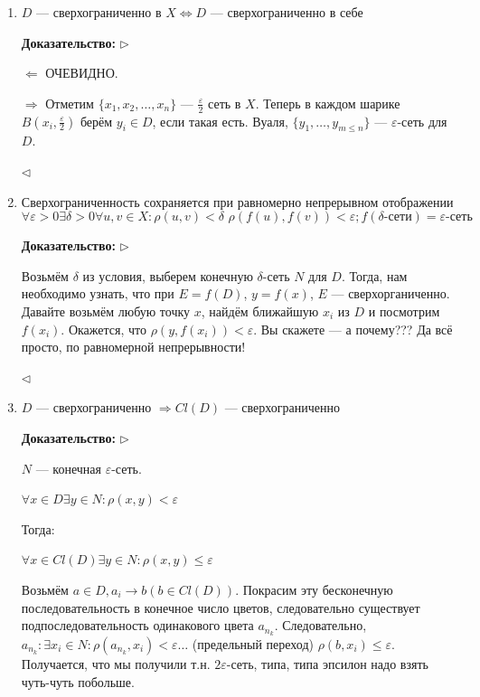 \documentclass{article}
\def\dbl{\,\,}
\begin{document}
\begin{enumerate}
    \item $D\text{ --- сверхограниченно в }X \Leftrightarrow D\text{ --- сверхограниченно в себе}$
    
    \textbf{Доказательство:}
    $\rhd$
    
    $\Leftarrow$ ОЧЕВИДНО.
    
    $\Rightarrow$ Отметим $\{x_1, x_2, \ldots, x_n\} $ --- $ \frac{\varepsilon}{2}$ сеть в $X$. Теперь в каждом шарике $B(x_i, \frac{\varepsilon}{2})$ берём $y_i \in D$, если такая есть. Вуаля, $\{y_1, \ldots, y_{m \le n}\}$ --- $\varepsilon$-сеть для $D$.
    
    $\lhd$

    \item $\text{Сверхограниченность сохраняется при равномерно непрерывном отображении}$ \[\forall \varepsilon > 0 \exists \delta > 0 \forall u, v \in X: \rho(u, v) < \delta \dbl \rho(f(u), f(v)) < \varepsilon; f(\delta\text{-сети}) = \varepsilon\textit{-сеть}\]
    
    \textbf{Доказательство:}
    $\rhd$
    
    Возьмём $\delta$ из условия, выберем конечную $\delta$-сеть $N$ для $D$. Тогда, нам необходимо узнать, что при $E = f(D)$, $y = f(x)$, $E$ --- сверхорганиченно. Давайте возьмём любую точку $x$, найдём ближайшую $x_i$ из $D$ и посмотрим $f(x_i)$. Окажется, что $\rho(y, f(x_i)) < \varepsilon$. Вы скажете --- а почему??? Да всё просто, по равномерной непрерывности!
    
    $\lhd$

    
    \item $D\text{ --- сверхограниченно }\Rightarrow Cl(D)\text{ --- сверхограниченно}$
    
    \textbf{Доказательство:}
    $\rhd$
    
    $N$ --- конечная $\varepsilon$-сеть.
    
    $\forall x \in D \exists y \in N : \rho(x, y) < \varepsilon$
    
    Тогда:
    
    $\forall x \in Cl(D) \exists y \in N : \rho(x, y) \le \varepsilon$
    
    Возьмём $a \in D, a_i \rightarrow b (b \in Cl(D))$. Покрасим эту бесконечную последовательность в конечное число цветов, следовательно существует подпоследовательность одинакового цвета $a_{n_k}$. Следовательно, $a_{n_k} : \exists x_i \in N : \rho(a_{n_k}, x_i) < \varepsilon \ldots$ (предельный переход) $\rho(b, x_i) \le \varepsilon$. Получается, что мы получили т.н. $2\varepsilon$-сеть, типа, типа эпсилон надо взять чуть-чуть побольше.
    

\end{enumerate}
\end{document}
